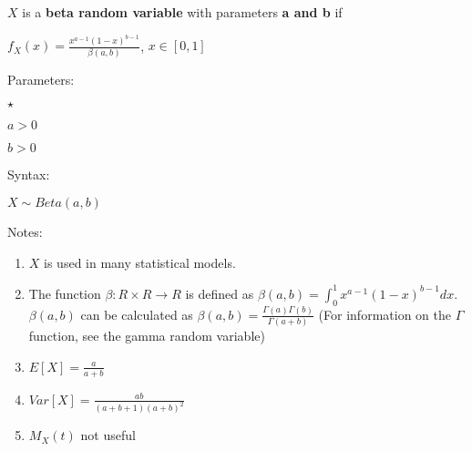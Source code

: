 \documentclass[12pt]{article}
\begin{document}
$X$ is a \textbf{beta random variable} with parameters \textbf{a and b} if\\
\par
$f_X(x) = \frac{x^{a-1} (1-x)^{b-1} }{\beta(a,b)}$,     $x \in [0,1]$	\\
\par
Parameters:\\
\par
\begin{list}{$\star$ }{}
\item $a > 0$
\item $b > 0$
\end{list}
\par
Syntax:\\
\par
$X\sim Beta(a,b)$\\
\par
Notes:\\
\par
\begin{enumerate}

\item $X$ is used in many statistical models.
\item The function $\beta: R\times R \to R$ is defined as $\beta(a,b) = \int_{0}^{1}{x^{a-1} (1-x)^{b-1} dx}$. $\beta(a,b)$ can be calculated as $\beta(a,b) = \frac {\Gamma(a) \Gamma(b) } {\Gamma(a+b)}$ (For information on the $\Gamma$ function, see the gamma random variable) 
\item $E[X] = \frac{a}{a+b}$
\item $Var[X] = \frac{ab}{(a+b+1)(a+b)^2}$
\item $M_X(t)$ not useful

\end{enumerate}
\end{document}
